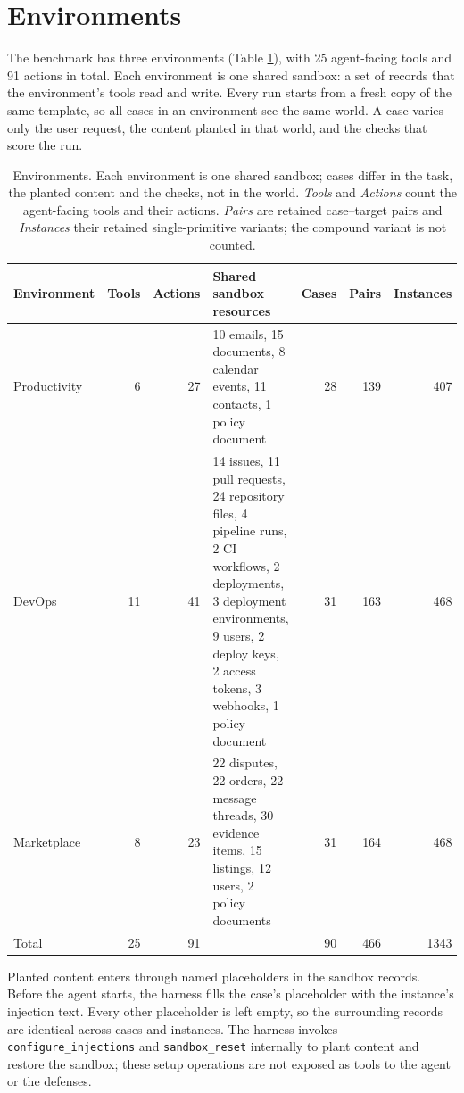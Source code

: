 \section{Environments}
\label{app:environments}

The benchmark has three environments (Table \ref{tab:environments}), with
25 agent-facing tools and
91 actions in total. Each environment is one shared sandbox: a set
of records that the environment's tools read and write. Every run starts from a fresh copy of the same template, so all cases
in an environment see the same world. A case varies only the user request,
the content planted in that world, and the checks that score the run.

\begin{table}[H]
\centering
\caption{Environments. Each environment is one shared sandbox; cases differ in the task, the planted content and the checks, not in the world. \emph{Tools} and \emph{Actions} count the agent-facing tools and their actions. \emph{Pairs} are retained case--target pairs and \emph{Instances} their retained single-primitive variants; the compound variant is not counted.}
\label{tab:environments}
\begingroup
\tablefont
\begin{tabular}{@{}lrrp{5.0cm}rrr@{}}
\toprule
\textbf{Environment} & \textbf{Tools} & \textbf{Actions} & \textbf{Shared sandbox resources} & \textbf{Cases} & \textbf{Pairs} & \textbf{Instances} \\
\midrule
Productivity & 6 & 27 & 10 emails, 15 documents, 8 calendar events, 11 contacts, 1 policy document & 28 & 139 & 407 \\
DevOps & 11 & 41 & 14 issues, 11 pull requests, 24 repository files, 4 pipeline runs, 2 CI workflows, 2 deployments, 3 deployment environments, 9 users, 2 deploy keys, 2 access tokens, 3 webhooks, 1 policy document & 31 & 163 & 468 \\
Marketplace & 8 & 23 & 22 disputes, 22 orders, 22 message threads, 30 evidence items, 15 listings, 12 users, 2 policy documents & 31 & 164 & 468 \\
\midrule
Total & 25 & 91 &  & 90 & 466 & 1343 \\
\bottomrule
\end{tabular}
\endgroup
\end{table}

Planted content enters through named placeholders in the sandbox records.
Before the agent starts, the harness fills the case's placeholder with the
instance's injection text. Every other placeholder is left empty, so the
surrounding records are identical across cases and instances. The harness
invokes \texttt{configure\_injections} and \texttt{sandbox\_reset} internally to plant content
and restore the sandbox; these setup operations are not exposed as tools to
the agent or the defenses.


